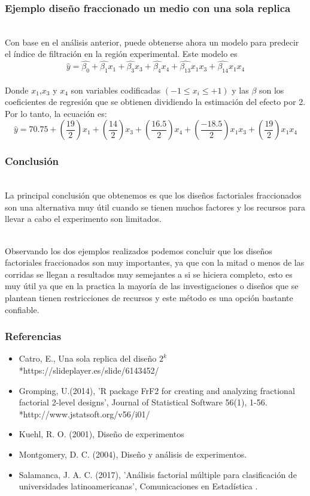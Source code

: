 \documentclass[12pt]{beamer}
\begin{document}
\begin{frame}
\frametitle{Ejemplo diseño fraccionado un medio con una sola replica}
~\\Con base en el análisis anterior, puede obtenerse ahora un modelo para predecir el índice de filtración en la región experimental. Este modelo es
$$\hat{y}=\hat{\beta_0}+\hat{\beta_1}x_1+\hat{\beta_3}x_3+\hat{\beta_4}x_4+\hat{\beta_{13}}x_1x_3+\hat{\beta_{14}}x_1x_4$$
~\\Donde $x_1$,$x_3$ y $x_4$ son variables codificadas $(-1\leq x_i\leq +1)$ y las $\beta$ son los coeficientes de regresión que se obtienen dividiendo la estimación del efecto por 2. Por lo tanto, la ecuación es:
$$\hat{y}=70.75+\left(\frac{19}{2}\right)x_1+\left(\frac{14}{2}\right)x_3+\left(\frac{16.5}{2}\right)x_4+\left(\frac{-18.5}{2}\right)x_1x_3+\left(\frac{19}{2}\right)x_1x_4$$

\end{frame}

\begin{frame}
\frametitle{Conclusión}
~\\La principal conclusión que obtenemos es que los diseños factoriales fraccionados son una alternativa muy útil cuando se tienen muchos factores y los recursos para llevar a cabo el experimento son limitados.

~\\ Observando los dos ejemplos realizados podemos concluir que los diseños factoriales fraccionados son muy importantes, ya que con la mitad o menos de las corridas se llegan a resultados muy semejantes a si se hiciera completo, esto es muy útil ya que en la practica la mayoría de las investigaciones o diseños que se plantean tienen restricciones de recursos y este método es una opción bastante confiable.


\end{frame}



\begin{frame}
\frametitle{Referencias}
\begin{itemize}

\item Catro, E., Una sola replica del diseño $ 2^{k} $ 
*https://slideplayer.es/slide/6143452/


\item Gromping, U.(2014), 'R package FrF2 for creating and analyzing fractional factorial 2-level designs', Journal
of Statistical Software 56(1), 1-56.
*http://www.jstatsoft.org/v56/i01/


\item Kuehl, R. O. (2001), Diseño de experimentos

\item Montgomery, D. C. (2004), Diseño y análisis de experimentos.

\item Salamanca, J. A. C. (2017), 'Análisis factorial múltiple para clasificación de universidades latinoamericanas', Comunicaciones en Estadística .
\end{itemize}
\end{frame}
\end{document}
